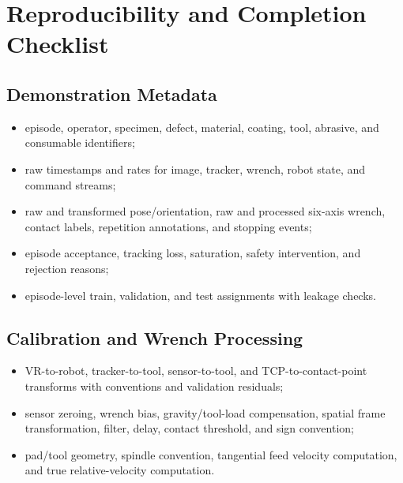 \appendix
\chapter{Reproducibility and Completion Checklist}
\label{chap:appendix}

\section{Demonstration Metadata}
\begin{itemize}
  \item episode, operator, specimen, defect, material, coating, tool, abrasive, and consumable identifiers;
  \item raw timestamps and rates for image, tracker, wrench, robot state, and command streams;
  \item raw and transformed pose/orientation, raw and processed six-axis wrench, contact labels, repetition annotations, and stopping events;
  \item episode acceptance, tracking loss, saturation, safety intervention, and rejection reasons;
  \item episode-level train, validation, and test assignments with leakage checks.
\end{itemize}

\section{Calibration and Wrench Processing}
\begin{itemize}
  \item VR-to-robot, tracker-to-tool, sensor-to-tool, and TCP-to-contact-point transforms with conventions and validation residuals;
  \item sensor zeroing, wrench bias, gravity/tool-load compensation, spatial frame transformation, filter, delay, contact threshold, and sign convention;
  \item pad/tool geometry, spindle convention, tangential feed velocity computation, and true relative-velocity computation.
\end{itemize}

